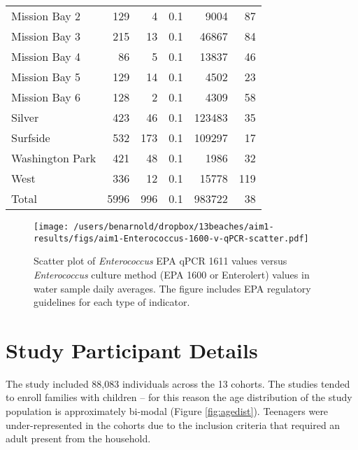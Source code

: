 \documentclass[12pt]{article}\usepackage[]{graphicx}\usepackage[]{color}
\begin{document}
\begin{table}[h!tb]
\begin{center}
\begin{tabular}{l rrrrr}
  Mission Bay 2 & 129 & 4 & 0.1 & 9004 & 87 \\ 
  Mission Bay 3 & 215 & 13 & 0.1 & 46867 & 84 \\ 
  Mission Bay 4 & 86 & 5 & 0.1 & 13837 & 46 \\ 
  Mission Bay 5 & 129 & 14 & 0.1 & 4502 & 23 \\ 
  Mission Bay 6 & 128 & 2 & 0.1 & 4309 & 58 \\ 
  Silver & 423 & 46 & 0.1 & 123483 & 35 \\ 
  Surfside & 532 & 173 & 0.1 & 109297 & 17 \\ 
  Washington Park & 421 & 48 & 0.1 & 1986 & 32 \\ 
  West & 336 & 12 & 0.1 & 15778 & 119 \\ 
  
\hline
 Total & 5996 & 996 & 0.1 & 983722 & 38 \\ 
  
\hline
\end{tabular}
\end{center}
\end{table}



\clearpage
\begin{figure}
\begin{center}
\texttt{[image: /users/benarnold/dropbox/13beaches/aim1-results/figs/aim1-Enterococcus-1600-v-qPCR-scatter.pdf]}
\caption{Scatter plot of \emph{Enterococcus} EPA qPCR 1611 values versus \emph{Enterococcus} culture method (EPA 1600 or Enterolert) values in water sample daily averages. The figure includes EPA regulatory guidelines for each type of indicator.
 \label{fig:entero1600v1611}}
\end{center}
\end{figure}

\clearpage
\section{Study Participant Details}

The study included 88,083 individuals across the 13 cohorts. The studies tended to enroll families with children  -- for this reason the age distribution of the study population is approximately bi-modal (Figure \ref{fig:agedist}). Teenagers were under-represented in the cohorts due to the inclusion criteria that required an adult present from the household. 
\end{document}

